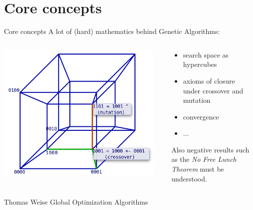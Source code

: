 \documentclass{beamer}
\begin{document}
\section{Core concepts}
\begin{frame}{Core concepts}
  A lot of (hard) mathematics behind Genetic Algorithms:
  \begin{columns}[onlytextwidth]
    \begin{column}{0.5\textwidth}
      \includegraphics[width=0.95\textwidth]{images/hypercube}
    \end{column}
    \begin{column}{0.5\textwidth}
     \begin{itemize}
      \item search space as hypercubes
      \item axioms of closure under crossover and mutation
      \item convergence
      \item ...
     \end{itemize}
     Also negative results such as the \emph{No Free Lunch Theorem} must
     be understood.
    \end{column}
  \end{columns}
  \footnotesize{
    \begin{thebibliography}{99}
       Thomas Weise
      \newblock Global Optimization Algorithms
    \end{thebibliography}
  }
\end{frame}
\end{document}
